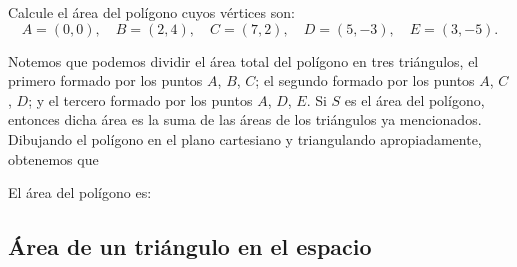 \begin{examplebox}{}{}
    Calcule el área del polígono cuyos vértices son:
    $$A = (0, 0), \quad B = (2, 4), \quad C = (7, 2), \quad D = (5, -3), \quad E = (3, -5).$$

    \tcblower
    \solucion Notemos que podemos dividir el área total del polígono en tres triángulos, el primero formado por los puntos $A$, $B$, $C$; el segundo formado por los puntos $A$, $C$, $D$; y el tercero formado por los puntos $A$, $D$, $E$. Si $S$ es el área del polígono, entonces dicha área es la suma de las áreas de los triángulos ya mencionados. Dibujando el polígono en el plano cartesiano y triangulando apropiadamente, obtenemos que
    \begin{center}
        \captionsetup*[figure]{hypcap=false}
    \end{center}
    El área del polígono es:
    \begin{matrizn}
    \end{matrizn}
\end{examplebox}

\subsection*{Área de un triángulo en el espacio}

